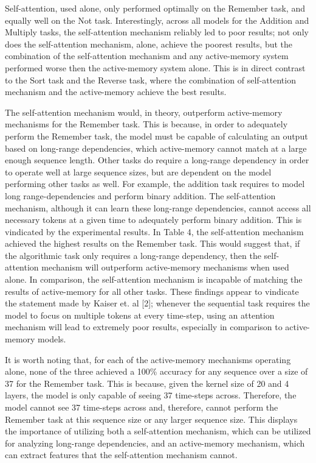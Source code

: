 \documentclass{article}
\begin{document}
Self-attention, used alone, only performed optimally on the Remember task, and equally well on the Not task.
Interestingly, across all models for the Addition and Multiply tasks, the self-attention mechanism reliably led to poor results; not only does the self-attention mechanism, alone, achieve the poorest results, but the combination of the self-attention mechanism and any active-memory system performed worse then the active-memory system alone. This is in direct contrast to the Sort task and the Reverse task, where the combination of self-attention mechanism and the active-memory achieve the best results.

The self-attention mechanism would, in theory, outperform active-memory mechanisms for the Remember task. This is because, in order to adequately perform the Remember task, the model must be capable of calculating an output based on long-range dependencies, which active-memory cannot match at a large enough sequence length. Other tasks do require a long-range dependency in order to operate well at large sequence sizes, but are dependent on the model performing other tasks as well. For example, the addition task requires to model long range-dependencies and perform binary addition. The self-attention mechanism, although it can learn these long-range dependencies, cannot access all necessary tokens at a given time to adequately perform binary addition. %
This is vindicated by the experimental results. In Table 4, the self-attention mechanism achieved the highest results on the Remember task. This would suggest that, if the algorithmic task only requires a long-range dependency, then the self-attention mechanism will outperform active-memory mechanisms when used alone. In comparison, the self-attention mechanism is incapable of matching the results of active-memory for all other tasks. These findings appear to vindicate the statement made by Kaiser et. al [2]; whenever the sequential task requires the model to focus on multiple tokens at every time-step, using an attention mechanism will lead to extremely poor results, especially in comparison to active-memory models.

It is worth noting that, for each of the active-memory mechanisms operating alone, none of the three achieved a 100\% accuracy for any sequence over a size of 37 for the Remember task. This is because, given the kernel size of 20 and 4 layers, the model is only capable of seeing 37 time-steps across. Therefore, the model cannot see 37 time-steps across and, therefore, cannot perform the Remember task at this sequence size or any larger sequence size. This displays the importance of utilizing both a self-attention mechanism, which can be utilized for analyzing long-range dependencies, and an active-memory mechanism, which can extract features that the self-attention mechanism cannot.
\end{document}

